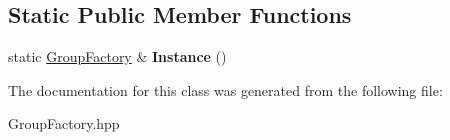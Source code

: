 \subsection*{Static Public Member Functions}
\begin{DoxyCompactItemize}
\item 
\mbox{\label{class_chapp_1_1_group_factory_a0b8de8120d3028bf1457f7f20ec22dec}} 
static \hyperlink{class_chapp_1_1_group_factory}{Group\+Factory} \& {\bfseries Instance} ()
\end{DoxyCompactItemize}


The documentation for this class was generated from the following file\+:\begin{DoxyCompactItemize}
\item 
Group\+Factory.\+hpp\end{DoxyCompactItemize}
